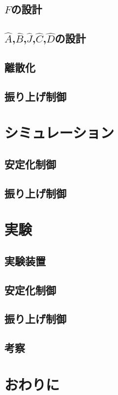 \documentclass[a4j,11pt,twoside]{jbook}
\begin{document}
\section{$F$の設計}
\section{$\hat{A}$,$\hat{B}$,$\hat{J}$,$\hat{C}$,$\hat{D}$の設計}
\section{離散化}
\section{振り上げ制御}	

\chapter{シミュレーション}
\section{安定化制御}
\section{振り上げ制御}

\chapter{実験}
\section{実験装置}
\section{安定化制御}
\section{振り上げ制御}
\section{考察}

\chapter{おわりに}
\end{document}
